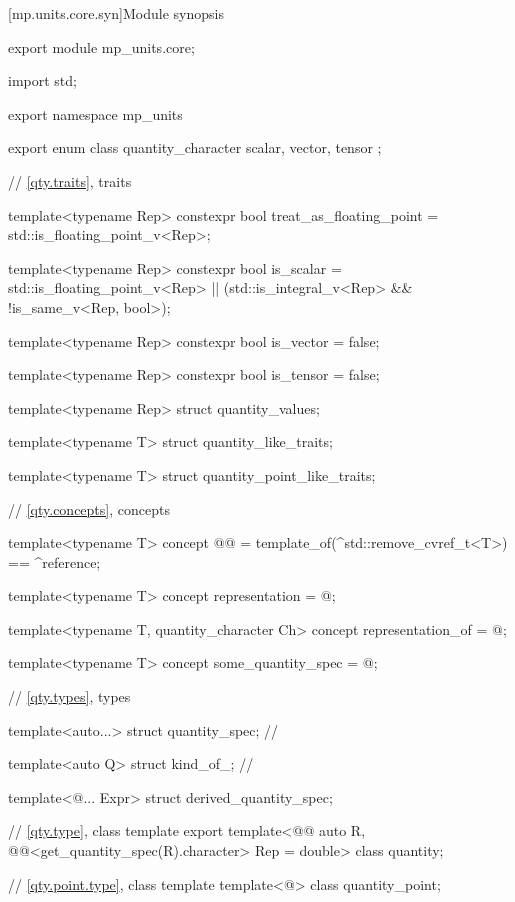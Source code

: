 [mp.units.core.syn]{Module  synopsis}
%
\begin{codeblock}
export module mp_units.core;

import std;

export namespace mp_units {

export enum class quantity_character { scalar, vector, tensor };

// \ref{qty.traits}, traits

template<typename Rep>
constexpr bool treat_as_floating_point = std::is_floating_point_v<Rep>;

template<typename Rep>
constexpr bool is_scalar =
  std::is_floating_point_v<Rep> || (std::is_integral_v<Rep> && !is_same_v<Rep, bool>);

template<typename Rep>
constexpr bool is_vector = false;

template<typename Rep>
constexpr bool is_tensor = false;

template<typename Rep>
struct quantity_values;

template<typename T>
struct quantity_like_traits;

template<typename T>
struct quantity_point_like_traits;

// \ref{qty.concepts}, concepts

template<typename T>
concept @@ = template_of(^std::remove_cvref_t<T>) == ^reference;

template<typename T>
concept representation = @\seebelownc@;

template<typename T, quantity_character Ch>
concept representation_of = @\seebelownc@;

template<typename T>
concept some_quantity_spec = @\seebelownc@;

// \ref{qty.types}, types

template<auto...>
struct quantity_spec; // \notdef

template<auto Q>
struct kind_of_; // \notdef

template<@\unspec@... Expr>
struct derived_quantity_spec;

// \ref{qty.type}, class template 
export template<@@ auto R,
                @@<get_quantity_spec(R).character> Rep = double>
class quantity;

// \ref{qty.point.type}, class template 
template<@\unspec@>
class quantity_point;

}
\end{codeblock}

